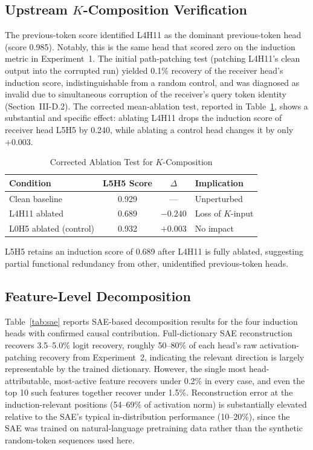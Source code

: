 \documentclass[conference]{IEEEtran}
\begin{document}
\subsection{Upstream $K$-Composition Verification}

The previous-token score identified L4H11 as the dominant previous-token head (score 0.985). Notably, this is the same head that scored zero on the induction metric in Experiment~1. The initial path-patching test (patching L4H11's clean output into the corrupted run) yielded 0.1\% recovery of the receiver head's induction score, indistinguishable from a random control, and was diagnosed as invalid due to simultaneous corruption of the receiver's query token identity (Section~III-D.2). The corrected mean-ablation test, reported in Table~\ref{tab:ablation}, shows a substantial and specific effect: ablating L4H11 drops the induction score of receiver head L5H5 by 0.240, while ablating a control head changes it by only $+0.003$.

\begin{table}[htbp]
\centering
\caption{Corrected Ablation Test for $K$-Composition}
\label{tab:ablation}
\begin{tabular}{lccl}
\toprule
\textbf{Condition} & \textbf{L5H5 Score} & \textbf{$\Delta$} & \textbf{Implication} \\
\midrule
Clean baseline & 0.929 & --- & Unperturbed \\
L4H11 ablated & 0.689 & $-0.240$ & Loss of $K$-input \\
L0H5 ablated (control) & 0.932 & $+0.003$ & No impact \\
\bottomrule
\end{tabular}
\end{table}

L5H5 retains an induction score of 0.689 after L4H11 is fully ablated, suggesting partial functional redundancy from other, unidentified previous-token heads.

\subsection{Feature-Level Decomposition}

Table~\ref{tab:sae} reports SAE-based decomposition results for the four induction heads with confirmed causal contribution. Full-dictionary SAE reconstruction recovers 3.5--5.0\% logit recovery, roughly 50--80\% of each head's raw activation-patching recovery from Experiment~2, indicating the relevant direction is largely representable by the trained dictionary. However, the single most head-attributable, most-active feature recovers under 0.2\% in every case, and even the top 10 such features together recover under 1.5\%. Reconstruction error at the induction-relevant positions (54--69\% of activation norm) is substantially elevated relative to the SAE's typical in-distribution performance (10--20\%), since the SAE was trained on natural-language pretraining data rather than the synthetic random-token sequences used here.
\end{document}
